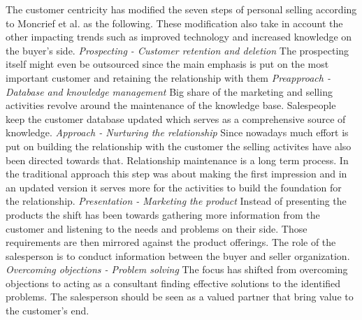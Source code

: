 \documentclass[12pt,a4paper,oneside,pdftex]{report}
\begin{document}
The customer centricity has modified the seven steps of personal selling according to Moncrief et al. as the following. These modification also take in account the other impacting trends such as improved technology and increased knowledge on the buyer's side. \newline \newline \emph{Prospecting - Customer retention and deletion}\newline 
The prospecting itself might even be outsourced since the main emphasis is put on the most important customer and retaining the relationship with them \citep{Moncrief}\newline \newline
\emph{Preapproach - Database and knowledge management}\newline 
Big share of the marketing and selling activities revolve around the maintenance of the knowledge base. Salespeople keep the customer database updated which serves as a comprehensive source of knowledge. \citep{Moncrief}\newline \newline
\emph{Approach - Nurturing the relationship}\newline
Since nowadays much effort is put on building the relationship with the customer the selling activites have also been directed towards that. Relationship maintenance is a long term process. In the traditional approach this step was about making the first impression and in an updated version it serves more for the activities to build the foundation for the relationship. \citep{Moncrief} \newline \newline
\emph{Presentation - Marketing the product}\newline
Instead of presenting the products the shift has been towards gathering more information from the customer and listening to the needs and problems on their side. Those requirements are then mirrored against the product offerings. The role of the salesperson is to conduct information between the buyer and seller organization.   \citep{Moncrief}\newline \newline
\emph{Overcoming objections - Problem solving}\newline
The focus has shifted from overcoming objections to acting as a consultant finding effective solutions to the identified problems. The salesperson should be seen as a valued partner that bring value to the customer's end. \citep{Moncrief}\newline \newline
\end{document}
